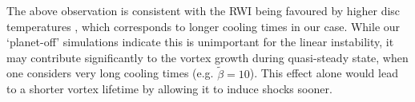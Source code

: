 The above observation is consistent with the RWI being favoured by higher
disc temperatures \citep{li00,lin12c}, which corresponds to longer
cooling times in our case. While our `planet-off' simulations indicate
this is unimportant for the linear instability, it may contribute 
significantly to the vortex growth during quasi-steady state, when one
considers very long cooling times (e.g. $\tilde{\beta}=10$). This
effect alone would lead to a shorter vortex lifetime by allowing it to
induce shocks sooner. 

%

